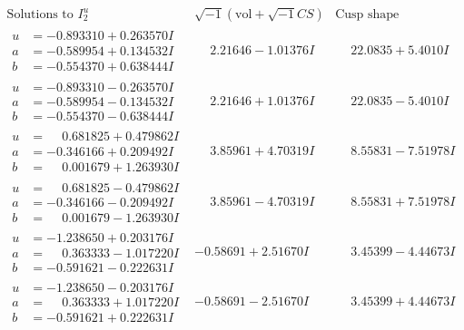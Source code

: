 \documentclass[1p]{elsarticle_modified}
\theoremstyle{definition}
\newcommand{\I}{\sqrt{-1}}
\begin{document}
$$\begin{array}{c|c|c}  
\text{Solutions to }I^u_{2}& \I (\text{vol} + \sqrt{-1}CS) & \text{Cusp shape}\\
 \hline 
\begin{aligned}
u &= -0.893310 + 0.263570 I \\
a &= -0.589954 + 0.134532 I \\
b &= -0.554370 + 0.638444 I\end{aligned}
 & \phantom{-}2.21646 - 1.01376 I & \phantom{-}22.0835 + 5.4010 I \\ \hline\begin{aligned}
u &= -0.893310 - 0.263570 I \\
a &= -0.589954 - 0.134532 I \\
b &= -0.554370 - 0.638444 I\end{aligned}
 & \phantom{-}2.21646 + 1.01376 I & \phantom{-}22.0835 - 5.4010 I \\ \hline\begin{aligned}
u &= \phantom{-}0.681825 + 0.479862 I \\
a &= -0.346166 + 0.209492 I \\
b &= \phantom{-}0.001679 + 1.263930 I\end{aligned}
 & \phantom{-}3.85961 + 4.70319 I & \phantom{-}8.55831 - 7.51978 I \\ \hline\begin{aligned}
u &= \phantom{-}0.681825 - 0.479862 I \\
a &= -0.346166 - 0.209492 I \\
b &= \phantom{-}0.001679 - 1.263930 I\end{aligned}
 & \phantom{-}3.85961 - 4.70319 I & \phantom{-}8.55831 + 7.51978 I \\ \hline\begin{aligned}
u &= -1.238650 + 0.203176 I \\
a &= \phantom{-}0.363333 - 1.017220 I \\
b &= -0.591621 - 0.222631 I\end{aligned}
 & -0.58691 + 2.51670 I & \phantom{-}3.45399 - 4.44673 I \\ \hline\begin{aligned}
u &= -1.238650 - 0.203176 I \\
a &= \phantom{-}0.363333 + 1.017220 I \\
b &= -0.591621 + 0.222631 I\end{aligned}
 & -0.58691 - 2.51670 I & \phantom{-}3.45399 + 4.44673 I \\ \hline\begin{aligned}

\end{aligned}
\end{array}$$
\end{document}
